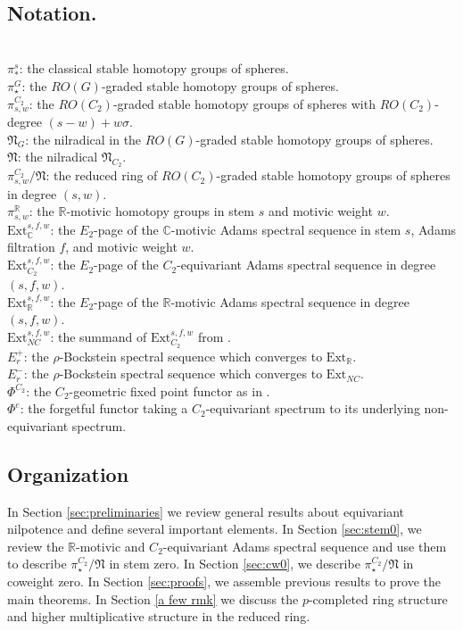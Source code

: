 \documentclass[psamsfonts]{amsart}
\newcommand{\C}{\mathbb C}
\newcommand{\fN}{\mathfrak N}
\newcommand{\Ext}{\mathrm {Ext}}
\theoremstyle{definition}
\theoremstyle{remark}
\newcommand{\R}{\mathbb{R}}
\numberwithin{equation}{section}
\begin{document}
\subsection{Notation.}$\ $\\
$\pi_*^s$: the classical stable homotopy groups of spheres.\\
$\pi_\star^G$: the $RO(G)$-graded stable homotopy groups of spheres.\\
$\pi_{s, w}^{C_2}$: the $RO(C_2)$-graded stable homotopy groups of spheres with $RO(C_2)$-degree $(s-w)+w\sigma$. \\
$\fN_G$: the nilradical in the $RO(G)$-graded stable homotopy groups of spheres. \\
$\fN$: the nilradical $\fN_{C_2}$.\\
$\pi_{s, w}^{C_2}/\fN$: the reduced ring of $RO(C_2)$-graded stable homotopy groups of spheres in degree $(s, w)$.\\
$\pi_{s,w}^\R$: the $\R$-motivic homotopy groups in stem $s$ and motivic weight $w$.\\
$\Ext_{\C}^{s,f,w}$: the $E_2$-page of the $\C$-motivic Adams spectral sequence
in stem $s$, Adams filtration $f$, and motivic weight $w$.\\
$\Ext_{C_2}^{s,f,w}$: the $E_2$-page of the $C_2$-equivariant Adams spectral
sequence in degree $(s,f,w)$.\\
$\Ext_{\R}^{s,f,w}$: the $E_2$-page of the $\R$-motivic Adams spectral sequence
in degree $(s,f,w)$.\\
$\Ext_{NC}^{s,f,w}$: the summand of $\Ext_{C_2}^{s,f,w}$ from \cite[\S2,3]{GHIR}. \\
$E_r^+$: the $\rho$-Bockstein spectral sequence which converges to $\Ext_\R$.\\
$E_r^-$: the $\rho$-Bockstein spectral sequence which converges to $\Ext_{NC}$.\\
$\Phi^{C_2}$: the $C_2$-geometric fixed point functor as in \cite{BS}.\\
$\Phi^e$: the forgetful functor taking a $C_2$-equivariant spectrum to its underlying non-equivariant spectrum.


\subsection{Organization} 
In Section \ref{sec:preliminaries} we review general results about
equivariant nilpotence and define several important elements.
In Section \ref{sec:stem0}, we review the $\R$-motivic and $C_2$-equivariant
Adams spectral sequence and use them to describe $\pi_\star^{C_2}/\fN$ in stem
zero. In Section \ref{sec:cw0}, we describe $\pi_\star^{C_2}/\fN$ in coweight
zero. In Section \ref{sec:proofs}, we assemble previous results to prove the main theorems. In Section \ref{a few rmk} we discuss the $p$-completed ring structure and higher multiplicative structure in the reduced ring. 
\end{document}
